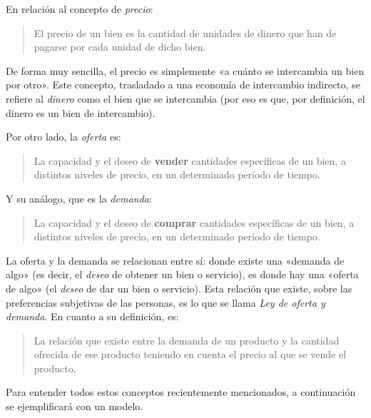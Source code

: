 \documentclass[12pt,a4paper,twoside]{book}
\begin{document}
En relación al concepto de \textit{precio}:

\begin{quotation}
El precio de un bien es la cantidad de unidades de dinero que han de pagarse por cada unidad de dicho bien. \cite[pág. 87]{mochobeker}
\end{quotation} 

De forma muy sencilla, el precio es simplemente «a cuánto se intercambia un bien por otro». Este concepto, trasladado a una economía de intercambio indirecto, se refiere al \textit{dinero} como el bien que se intercambia (por eso es que, por definición, el dinero es un bien de intercambio).

Por otro lado, la \textit{oferta} es:

\begin{quotation}
La capacidad y el deseo de \textbf{vender} cantidades específicas de un bien, a distintos niveles de precio, en un determinado período de tiempo. \cite[pág. 87]{mochobeker}
\end{quotation}

Y su análogo, que es la \textit{demanda}:

\begin{quotation}
La capacidad y el deseo de \textbf{comprar} cantidades específicas de un bien, a distintos niveles de precio, en un determinado período de tiempo. \cite[pág. 87]{mochobeker}
\end{quotation}

La oferta y la demanda se relacionan entre sí: donde existe una «demanda de algo» (es decir, el \textit{deseo} de obtener un bien o servicio), es donde hay una «oferta de algo» (el \textit{deseo} de dar un bien o servicio). Esta relación que existe, sobre las preferencias subjetivas de las personas, es lo que se llama \textit{Ley de oferta y demanda}. En cuanto a su definición, es:

\begin{quotation}
La relación que existe entre la demanda de un producto y la cantidad ofrecida de ese producto teniendo en cuenta el precio al que se vende el producto. \cite{epedia:ley-o-d}
\end{quotation}

Para entender todos estos conceptos recientemente mencionados, a continuación se ejemplificará con un modelo.
\end{document}
